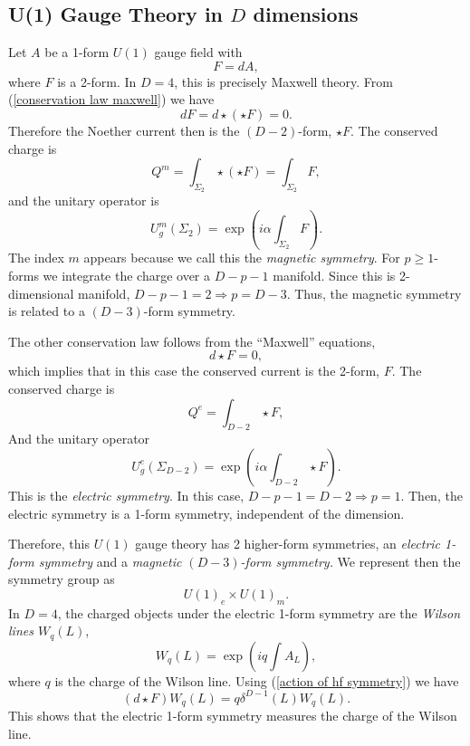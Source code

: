\documentclass{article}
\begin{document}
\subsection*{U(1) Gauge Theory in $D$ dimensions}
Let $A$ be a 1-form $U(1)$ gauge field with 
\begin{equation}\label{conservation law maxwell}
	F=dA,
\end{equation}
where $F$ is a 2-form. In $D=4$, this is precisely Maxwell theory. From (\ref{conservation law maxwell}) we have
\begin{equation}
	dF=d\star(\star F)=0. 
\end{equation}
Therefore the Noether current then is the $(D-2)$-form, $\star F$.  The conserved charge is 
\begin{equation}
	Q^m=\int_{\Sigma_2}\star (\star F)=\int_{\Sigma_2}F,
\end{equation}
and the unitary operator is 
\begin{equation}
	U_g^m(\Sigma_2)=\exp\left(i\alpha\int_{\Sigma_2}F\right).
\end{equation}
The index $m$ appears because we call this the \textit{magnetic symmetry}. For $p\geq 1$-forms we integrate the charge over a $D-p-1$ manifold. Since this is 2-dimensional manifold, $D-p-1=2\Rightarrow p=D-3$. Thus, the magnetic symmetry is related to a $(D-3)$-form symmetry. 

The other conservation law follows from the ``Maxwell'' equations,
\begin{equation}
	d\star F=0,
\end{equation} 
which implies that in this case the conserved current is the 2-form, $F$. The conserved charge is 
\begin{equation}
	Q^e=\int_{D-2}\star F, 
\end{equation}
And the unitary operator
\begin{equation}
	U^e_g(\Sigma_{D-2})=\exp\left(i\alpha\int_{D-2}\star F\right).
\end{equation}
This is the \textit{electric symmetry}. In this case, $D-p-1=D-2\Rightarrow p=1$. Then, the electric symmetry is a 1-form symmetry, independent of the dimension. 

Therefore, this $U(1)$ gauge theory has 2 higher-form symmetries, an \textit{electric 1-form symmetry} and a \textit{magnetic $(D-3)$-form symmetry.} We represent then the symmetry group as 
\begin{equation}
	U(1)_e\times U(1)_m. 
\end{equation}
In $D=4$, the charged objects under the electric 1-form symmetry are the \textit{Wilson lines $W_q(L)$},
\begin{equation}
	W_q(L)=\exp\left(iq\int A_L\right),
\end{equation}
where $q$ is the charge of the Wilson line. Using (\ref{action of hf symmetry}) we have
\begin{equation}
	(d\star F)W_q(L)=q\delta^{D-1}(L)W_q(L). 
\end{equation}
This shows that the electric 1-form symmetry measures the charge of the Wilson line.
\end{document}
